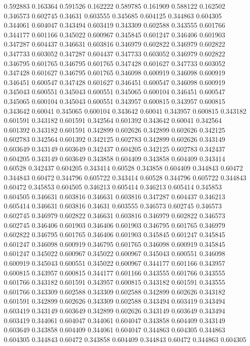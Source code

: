 0.592883 0.163364
0.591526 0.162222
0.589785 0.161909
0.588122 0.162502
0.346573 0.602745
0.34631 0.603555
0.345685 0.604125
0.344863 0.604305
0.344061 0.604047
0.343494 0.603419
0.343309 0.602588
0.343555 0.601766
0.344177 0.601166
0.345022 0.600967
0.345845 0.601247
0.346406 0.601903
0.347287 0.604437
0.346631 0.603816
0.346979 0.602822
0.346979 0.602822
0.347733 0.603052
0.347287 0.604437
0.347733 0.603052
0.346979 0.602822
0.346795 0.601765
0.346795 0.601765
0.347428 0.601627
0.347733 0.603052
0.347428 0.601627
0.346795 0.601765
0.346098 0.600919
0.346098 0.600919
0.346451 0.600547
0.347428 0.601627
0.346451 0.600547
0.346098 0.600919
0.345043 0.600551
0.345043 0.600551
0.345065 0.600104
0.346451 0.600547
0.345065 0.600104
0.345043 0.600551
0.343957 0.600815
0.343957 0.600815
0.343642 0.60041
0.345065 0.600104
0.343642 0.60041
0.343957 0.600815
0.343182 0.601591
0.343182 0.601591
0.342564 0.601392
0.343642 0.60041
0.342564 0.601392
0.343182 0.601591
0.342899 0.602626
0.342899 0.602626
0.342125 0.602783
0.342564 0.601392
0.342125 0.602783
0.342899 0.602626
0.343149 0.603649
0.343149 0.603649
0.342437 0.604205
0.342125 0.602783
0.342437 0.604205
0.343149 0.603649
0.343858 0.604409
0.343858 0.604409
0.343414 0.60528
0.342437 0.604205
0.343414 0.60528
0.343858 0.604409
0.344843 0.60472
0.344843 0.60472
0.344796 0.605722
0.343414 0.60528
0.344796 0.605722
0.344843 0.60472
0.345853 0.604505
0.346213 0.605414
0.346213 0.605414
0.345853 0.604505
0.346631 0.603816
0.346631 0.603816
0.347287 0.604437
0.346213 0.605414
0.346631 0.603816
0.34631 0.603555
0.346573 0.602745
0.346573 0.602745
0.346979 0.602822
0.346631 0.603816
0.346979 0.602822
0.346573 0.602745
0.346406 0.601903
0.346406 0.601903
0.346795 0.601765
0.346979 0.602822
0.346795 0.601765
0.346406 0.601903
0.345845 0.601247
0.345845 0.601247
0.346098 0.600919
0.346795 0.601765
0.346098 0.600919
0.345845 0.601247
0.345022 0.600967
0.345022 0.600967
0.345043 0.600551
0.346098 0.600919
0.345043 0.600551
0.345022 0.600967
0.344177 0.601166
0.343957 0.600815
0.343957 0.600815
0.344177 0.601166
0.343555 0.601766
0.343555 0.601766
0.343182 0.601591
0.343957 0.600815
0.343182 0.601591
0.343555 0.601766
0.343309 0.602588
0.343309 0.602588
0.342899 0.602626
0.343182 0.601591
0.342899 0.602626
0.343309 0.602588
0.343494 0.603419
0.343494 0.603419
0.343149 0.603649
0.342899 0.602626
0.343149 0.603649
0.343494 0.603419
0.344061 0.604047
0.344061 0.604047
0.343858 0.604409
0.343149 0.603649
0.343858 0.604409
0.344061 0.604047
0.344863 0.604305
0.344863 0.604305
0.344843 0.60472
0.343858 0.604409
0.344843 0.60472
0.344863 0.604305

